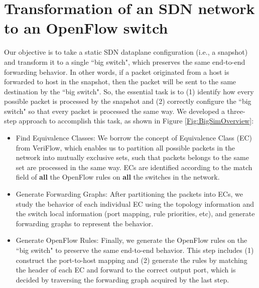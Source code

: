 \section{Transformation of an SDN network to an OpenFlow switch}
\label{Sec:Design}

Our objective is to take a static SDN dataplane configuration (i.e., a snapshot) and transform it to a single ``big switch", which preserves the same end-to-end forwarding behavior. In other words, if a packet originated from a host is forwarded to host in the snapshot, then the packet will be sent to the same destination by the ``big switch". So, the essential task is to (1) identify how every possible packet is processed by the snapshot and (2) correctly configure the ``big switch" so that every packet is processed the same way. We developed a three-step approach to accomplish this task, as shown in Figure \ref{Fig:BigSimOverview}:

\begin{itemize}
\item Find Equivalence Classes: We borrow the concept of Equivalence Class (EC) from VeriFlow\cite{Veriflow}, which enables us to partition all possible packets in the network into mutually exclusive sets, such that packets belongs to the same set are processed in the same way. ECs are identified according to the match field of \textbf{all} the OpenFlow rules on \textbf{all} the switches in the network.
\item Generate Forwarding Graphs: After partitioning the packets into ECs, we study the behavior of each individual EC using the topology information and the switch local information (port mapping, rule priorities, etc), and generate forwarding graphs to represent the behavior.  
\item Generate OpenFlow Rules: Finally, we generate the OpenFlow rules on the ``big switch" to preserve the same end-to-end behavior. This step includes (1) construct the port-to-host mapping and (2) generate the rules by matching the header of each EC and forward to the correct output port, which is decided by traversing the forwarding graph acquired by the last step.
\end{itemize}

